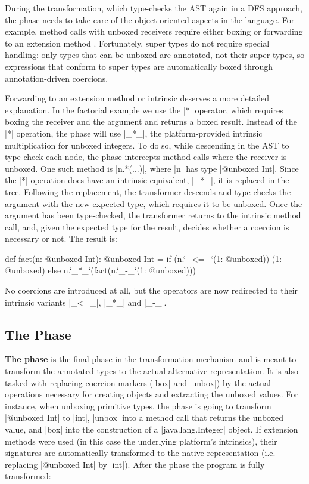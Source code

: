 During the transformation, which type-checks the AST again in a DFS approach, the \coerce{} phase needs to take care of the object-oriented aspects in the language. For example, method calls with unboxed receivers require either boxing or forwarding to an extension method \cite{scala-value-classes-sip}. Fortunately, super types do not require special handling: only types that can be unboxed are annotated, not their super types, so expressions that conform to super types are automatically boxed through annotation-driven coercions.

Forwarding to an extension method or intrinsic deserves a more detailed explanation. In the factorial example we use the |*| operator, which requires boxing the receiver and the argument and returns a boxed result. Instead of the |*| operation, the \coerce{} phase will use |_*_|, the platform-provided intrinsic multiplication for unboxed integers. To do so, while descending in the AST to type-check each node, the \coerce{} phase intercepts method calls where the receiver is unboxed. One such method is |n.*(...)|, where |n| has type |@unboxed Int|. Since the |*| operation does have an intrinsic equivalent, |_*_|, it is replaced in the tree. Following the replacement, the \coerce{} transformer descends and type-checks the argument with the new expected type, which requires it to be unboxed. Once the argument has been type-checked, the \coerce{} transformer returns to the intrinsic method call, and, given the expected type for the result, decides whether a coercion is necessary or not. The result is:

\begin{lstlisting-nobreak}
 def fact(n: @unboxed Int): @unboxed Int =
   if (n.`_<=_`(1: @unboxed))
     (1: @unboxed)
   else
     n.`_*_`(fact(n.`_-_`(1: @unboxed)))
\end{lstlisting-nobreak}

No coercions are introduced at all, but the operators are now redirected to their intrinsic variants |_<=_|, |_*_| and |_-_|.

\subsection{The \Commit{} Phase}
\label{sec:transform:commit}

\textbf{The \commit{} phase} is the final phase in the transformation mechanism and is meant to transform the annotated types to the actual alternative representation. It is also tasked with replacing coercion markers (|box| and |unbox|) by the actual operations necessary for creating objects and extracting the unboxed values. For instance, when unboxing primitive types, the \commit{} phase is going to transform |@unboxed Int| to |int|, |unbox| into a method call that returns the unboxed value, and |box| into the construction of a |java.lang.Integer| object. If extension methods were used (in this case the underlying platform's intrinsics), their signatures are automatically transformed to the native representation (i.e. replacing |@unboxed Int| by |int|). After the \commit{} phase the program is fully transformed:

